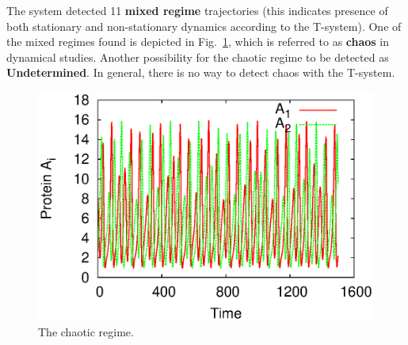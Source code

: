 \documentclass[11pt,a4paper]{article}
\begin{document}
The system detected 11 \textbf{mixed regime} trajectories (this indicates presence
of both stationary and non-stationary dynamics according to the T-system). One of the
mixed regimes found is depicted in Fig.~\ref{fig:rB2_chaos}, which is referred to as
\textbf{chaos} in dynamical studies. Another possibility for the chaotic regime to be
detected as \textbf{Undetermined}. In general, there is no way to detect chaos with
the T-system.

\begin{figure}[h]
  \centering
  \includegraphics[scale=0.7]{rB2_chaos}
  \caption{The chaotic regime.}
  \label{fig:rB2_chaos}
\end{figure}

\newpage


\end{document}
